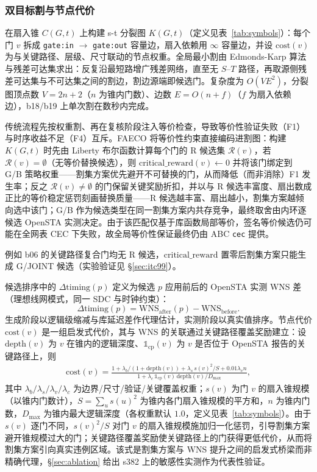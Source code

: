 \documentclass[journal]{IEEEtran}
\begin{document}
\subsubsection{双目标割与节点代价}
在扇入锥 $C(G, t)$ 上构建 s-t 分裂图 $K(G, t)$（定义见表~\ref{tab:symbols}）：每个门 $v$ 拆成 \texttt{gate:in} $\rightarrow$ \texttt{gate:out} 容量边，扇入依赖用 $\infty$ 容量边，并设 $\mathrm{cost}(v)$ 为与关键路径、层级、尺寸联动的节点权重。全局最小割由 Edmonds-Karp 算法与残差可达集求出：反复沿最短路增广残差网络，直至无 $S$--$T$ 路径，再取源侧残差可达集与不可达集之间的割边，割边源端即候选门。复杂度为 $O(VE^2)$，分裂图顶点数 $V=2n+2$（$n$ 为锥内门数）、边数 $E=O(n+f)$（$f$ 为扇入依赖边），b18/b19 上单次割在数秒内完成。

传统流程先按权重割、再在复核阶段注入等价检查，导致等价性验证失败（F1）与时序收益不足（F4）互斥。FAECO 将等价性约束直接编码进割图：构建 $K(G, t)$ 时先由 Liberty 布尔函数计算每个门的 R 候选集 $\mathcal{R}(v)$，若 $\mathcal{R}(v)=\emptyset$（无等价替换候选），则 $\mathrm{critical\_reward}(v) \leftarrow 0$ 并将该门绑定到 G/B 策略权重——割集方案优先避开不可替换的门，从而降低（而非消除）F1 发生率；反之 $\mathcal{R}(v)\neq\emptyset$ 的门保留关键奖励折扣，并以与 R 候选丰富度、扇出数成正比的等价稳定惩罚刻画替换质量——R 候选越丰富、扇出越小，割集方案越倾向选中该门；G/B 作为候选类型在同一割集方案内共存竞争，最终取舍由内环逐候选 OpenSTA 实测决定。由于该匹配仅基于库函数局部等价，签名等价候选仍可能在全网表 CEC 下失败，故全局等价性保证最终仍由 ABC \texttt{cec} 提供。

例如 b06 的关键路径复合门均无 R 候选，$\mathrm{critical\_reward}$ 置零后割集方案只能生成 G/JOINT 候选（实验验证见 \S\ref{sec:itc99}）。

候选排序中的 $\Delta\mathrm{timing}(p)$ 定义为候选 $p$ 应用前后的 OpenSTA 实测 WNS 差（理想线网模式，同一 SDC 与时钟约束）：
\begin{equation}\label{eq:dtiming}
\Delta\mathrm{timing}(p) = \mathrm{WNS}_{\mathrm{after}}(p) - \mathrm{WNS}_{\mathrm{before}}.
\end{equation}
生成阶段以逻辑级缩减与库延迟差作代理估计，实测阶段以真实值排序。节点代价 $\mathrm{cost}(v)$ 是一组启发式代价，其与 WNS 的关联通过关键路径覆盖奖励建立：设 $\mathrm{depth}(v)$ 为 $v$ 在锥内的逻辑深度、$\mathbb{1}_{\mathrm{cp}}(v)$ 为 $v$ 是否位于 OpenSTA 报告的关键路径上，则
{\small
\begin{equation}
\label{eq:cost}
\begin{split}
\mathrm{cost}(v) = \frac{1 + \lambda_b/(1+\mathrm{depth}(v)) + \lambda_s\,s(v)^2/S + 0.01\lambda_v n}{1 + \lambda_c\,\mathbb{1}_{\mathrm{cp}}(v)\,\mathrm{depth}(v)/D_{\max}},
\end{split}
\end{equation}
}
其中 $\lambda_b/\lambda_s/\lambda_v/\lambda_c$ 为边界/尺寸/验证/关键覆盖权重；$s(v)$ 为门 $v$ 的扇入锥规模（以锥内门数计），$S=\sum_u s(u)^2$ 为锥内各门扇入锥规模的平方和，$n$ 为锥内门数，$D_{\max}$ 为锥内最大逻辑深度（各权重默认 $1.0$，定义见表~\ref{tab:symbols}）。由于 $s(v)$ 逐门不同，$s(v)^2/S$ 对门 $v$ 的扇入锥规模施加归一化惩罚，引导割集方案避开锥规模过大的门；关键路径覆盖奖励使关键路径上的门获得更低代价，从而将割集方案引向真实违例区域。该式是割集方案与 WNS 提升之间的启发式桥梁而非精确代理，\S\ref{sec:ablation} 给出 s382 上的敏感性实测作为代表性验证。
\end{document}
